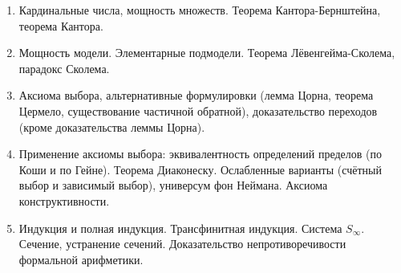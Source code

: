 \documentclass[11pt,a4paper,oneside]{scrartcl}
\begin{document}
\begin{enumerate}
\item Кардинальные числа, мощность множеств. Теорема Кантора-Бернштейна, теорема Кантора. 
\item Мощность модели. Элементарные подмодели. Теорема Лёвенгейма-Сколема, парадокс Сколема.
\item Аксиома выбора, альтернативные формулировки (лемма Цорна, теорема Цермело, существование
частичной обратной), доказательство переходов (кроме доказательства леммы Цорна).
\item Применение аксиомы выбора: эквивалентность определений пределов (по Коши и по Гейне).
Теорема Диаконеску. Ослабленные варианты (счётный выбор и зависимый выбор), универсум фон Неймана.
Аксиома конструктивности.
\item Индукция и полная индукция. Трансфинитная индукция. Система $S_\infty$. 
Сечение, устранение сечений. Доказательство непротиворечивости формальной арифметики.
\end{enumerate}
\end{document}
